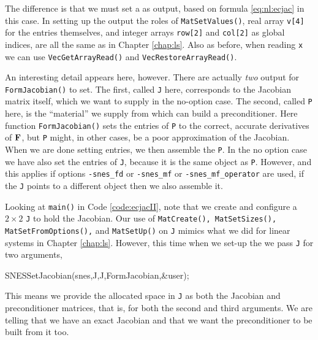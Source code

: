 The difference is that we must set a \pMat as output, based on formula \eqref{eq:nl:ecjac} in this case.  In setting up the output \pMat the roles of \texttt{MatSetValues()}, real array \texttt{v[4]} for the entries themselves, and integer arrays \texttt{row[2]} and \texttt{col[2]} as global indices, are all the same as in Chapter \ref{chap:ls}.  Also as before, when reading \texttt{x} we can use \texttt{VecGetArrayRead()} and \texttt{VecRestoreArrayRead()}.


An interesting detail appears here, however.  There are actually \emph{two} output \pMats for \texttt{FormJacobian()} to set.  The first, called \texttt{J} here, corresponds to the Jacobian matrix itself, which we want to supply in the no-option case.  The second, called \texttt{P} here, is the ``material'' we supply from which \PETSc can build a preconditioner.  Here function \texttt{FormJacobian()} sets the entries of \pMat \texttt{P} to the correct, accurate derivatives of $\mathbf{F}$, but \texttt{P}  might, in other cases, be a poor approximation of the Jacobian.  When we are done setting entries, we then assemble the \pMat \texttt{P}.  In the no option case we have also set the entries of \pMat \texttt{J}, because it is the same \pMat object as \texttt{P}.  However, and this applies if options \texttt{-snes\_fd} or \texttt{-snes\_mf} or \texttt{-snes\_mf\_operator} are used, if the \pMat \texttt{J} points to a different object then we also assemble it.

Looking at \texttt{main()} in Code \ref{code:ecjacII}, note that we create and configure a $2\times 2$ \pMat \texttt{J} to hold the Jacobian.  Our use of \texttt{MatCreate(), MatSetSizes(), MatSetFromOptions(),} and \texttt{MatSetUp()} on \texttt{J} mimics what we did for linear systems in Chapter \ref{chap:ls}.  However, this time when we set-up the \pSNES we pass \texttt{J} for two arguments,
\begin{code}
SNESSetJacobian(snes,J,J,FormJacobian,&user);
\end{code}
This means we provide the allocated space in \texttt{J} as both the Jacobian and preconditioner matrices, that is, for both the second and third \pMat arguments.  We are telling \PETSc that we have an exact Jacobian and that we want the preconditioner to be built from it too.

